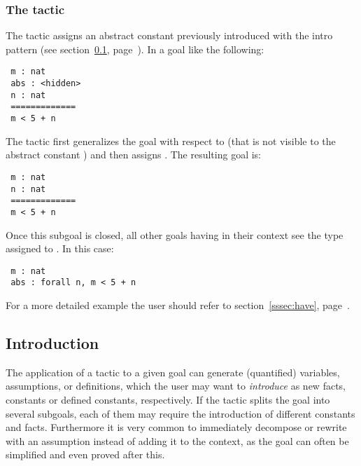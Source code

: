 \subsubsection*{The  tactic}\label{ssec:abstract}

The  tactic assigns an abstract constant previously introduced with
the \ssrC{[: name ]} intro pattern (see section~\ref{ssec:intro},
page~\pageref{ssec:introabstract}).
In a goal like the following:
\begin{lstlisting}
 m : nat
 abs : <hidden>
 n : nat
 =============
 m < 5 + n
\end{lstlisting}
The tactic  first generalizes the goal with respect to
 (that is not visible to the abstract constant ) and then
assigns .  The resulting goal is:
\begin{lstlisting}
 m : nat
 n : nat
 =============
 m < 5 + n
\end{lstlisting}
Once this subgoal is closed, all other goals having  in their context
see the type assigned to .  In this case:
\begin{lstlisting}
 m : nat
 abs : forall n, m < 5 + n
\end{lstlisting}

For a more detailed example the user should refer to section~\ref{sssec:have},
page~\pageref{sec:havetransparent}.

\subsection{Introduction}\label{ssec:intro}
\idx{\dots{} => \dots{}}

The application of a tactic to a given goal can generate
(quantified) variables, assumptions, or definitions, which the user may want to
\emph{introduce} as new facts, constants or defined constants, respectively.
If the tactic splits the goal into several subgoals,
each of them may require the introduction of different constants and facts.
Furthermore it is very common to immediately decompose
or rewrite with an assumption instead of adding it to the context,
as the goal can often be simplified and even
proved after this.

